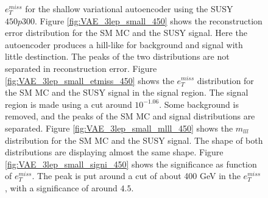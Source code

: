 \begin{figure}[h!]
{    $e_T^{miss}$ for the shallow variational autoencoder using the SUSY $450p300$. 
    Figure \ref{fig:VAE_3lep_small_450} shows the reconstruction error 
    distribution for the SM MC and the SUSY signal. Here the autoencoder produces a hill-like for background and 
    signal with little destinction. The peaks of the two distributions are not separated in reconstruction error. Figure \ref{fig:VAE_3lep_small_etmiss_450} 
    shows the $e_T^{miss}$ distribution for the SM MC and the SUSY signal in the signal region. 
    The signal region is made using a cut around $10^{-1.06}$. Some background is removed, and the peaks of the SM MC and signal 
    distributions are separated. Figure \ref{fig:VAE_3lep_small_mlll_450} shows the $m_{lll}$ distribution for the SM MC and the SUSY signal. 
    The shape of both distributions are displaying almost the same shape. Figure \ref{fig:VAE_3lep_small_signi_450} shows the significance as 
    function of $e_T^{miss}$. The peak is put around a cut of about 400 GeV in the $e_T^{miss}$, with a significance of around $4.5$.}
    \label{fig:VAE_3lep_small_rec_sig_signi_450}
\end{figure}








